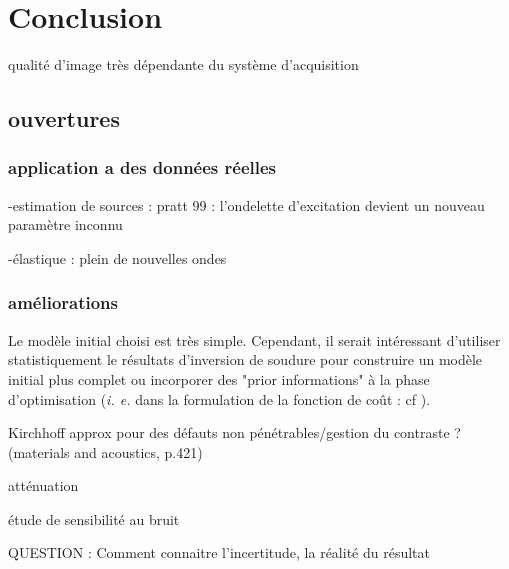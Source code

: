 \chapter{Conclusion}



qualité d'image très dépendante du système d'acquisition

\section{ouvertures}

\subsection{application a des données réelles}
-estimation de sources : pratt 99 : l'ondelette d'excitation devient un nouveau paramètre inconnu 

-élastique : plein de nouvelles ondes 


\subsection{améliorations}
Le modèle initial choisi est très simple. Cependant, il serait intéressant d'utiliser statistiquement le résultats d'inversion de soudure pour construire un modèle initial plus complet ou incorporer des "prior informations" à la phase d'optimisation (\emph{i. e.} dans la formulation de la fonction de coût : cf \cite{asnaashari}).

Kirchhoff approx pour des défauts non pénétrables/gestion du contraste ? (materials and acoustics, p.421)

atténuation

étude de sensibilité au bruit

QUESTION : 
Comment connaitre l'incertitude, la réalité du résultat
